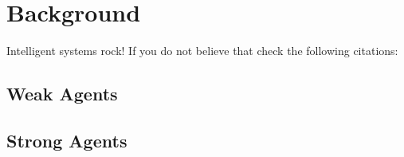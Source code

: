 \section{Background}
Intelligent systems rock! If you do not believe that check the following 
citations: \cite{Franklin96}
\subsection{Weak Agents}

\subsection{Strong Agents}

